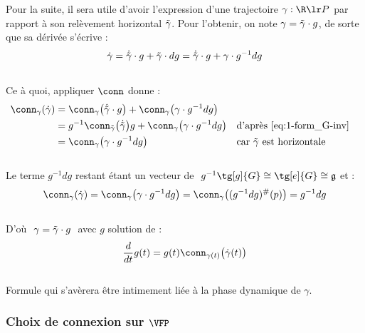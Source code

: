 Pour la suite, il sera utile d'avoir l'expression d'une trajectoire $\gamma:\R\lr P$ par rapport à son relèvement horizontal $\Tilde{\gamma}$. Pour l'obtenir, on note  $\gamma = \Tilde{\gamma}\cdot g$, de sorte que sa dérivée s'écrive :
\[\dot{\gamma} = \dot{\Tilde{\gamma}}\cdot g + \Tilde{\gamma}\cdot dg = \dot{\Tilde{\gamma}}\cdot g + \gamma \cdot g^{-1}dg\]
\\
Ce à quoi, appliquer $\conn$ donne :
\begin{align*}
\conn_\gamma(\dot{\gamma}) &= \conn_\gamma\big( \dot{\Tilde{\gamma}}\cdot g \big) + \conn_\gamma \big( \gamma \cdot g^{-1}dg \big) \\
&= g^{-1}\conn_{\Tilde{\gamma}}\big(\dot{\Tilde{\gamma}} \big) g + \conn_\gamma \big( \gamma \cdot g^{-1}dg \big)   &  &\text{d'après \eqref{eq:1-form_G-inv}} \\
&= \conn_\gamma \big( \gamma \cdot g^{-1}dg \big)  &  &\text{car $\Tilde{\gamma}$ est horizontale}
\end{align*}
\\
Le terme $g^{-1}dg$ restant étant un vecteur de $\ g^{-1}\tg[g]{G}\cong \tg[e]{G}\cong \mathfrak{g}$ et :
\[\conn_\gamma(\dot{\gamma}) = \conn_\gamma \big( \gamma \cdot g^{-1}dg \big) = \conn_\gamma \big( (g^{-1}dg)^\#(p) \big) = g^{-1}dg\]
\\
D'où $\ \gamma = \Tilde{\gamma}\cdot g\ $ avec $g$ solution de :
\begin{equation} \label{eq:deviation2hozi}
\frac{d}{dt}g(t)  = g(t) \conn_{\gamma(t)}\big( \dot{\gamma}(t) \big)
\end{equation}
\\
Formule qui s'avèrera être intimement liée à la phase dynamique de $\gamma$.
\\



\subsubsection{Choix de connexion sur $\bf{\VFP}$}\label{subsec:conn2SUPC}


